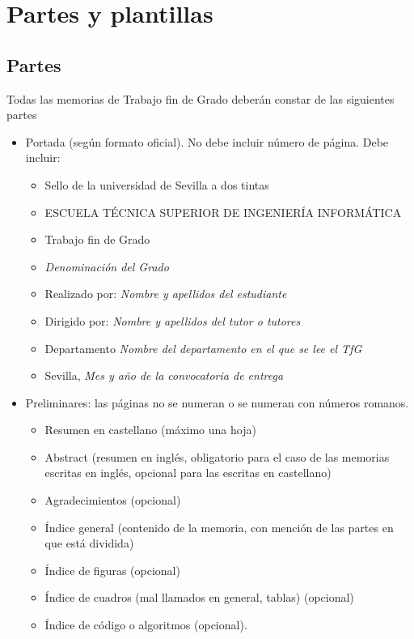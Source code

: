 
\chapter{Partes y plantillas}

\section{Partes}\label{sec:partes}

Todas las memorias de Trabajo fin de Grado deberán constar de las siguientes partes 
\begin{itemize}
 \item Portada (seg\'un formato oficial). No debe incluir n\'umero de p\'agina. Debe incluir:
 \begin{itemize}
 \item Sello de la universidad de Sevilla a dos tintas
 \item ESCUELA T\'ECNICA SUPERIOR DE INGENIER\'IA INFORM\'ATICA
 \item Trabajo fin de Grado
 \item \emph{Denominaci\'on del Grado}
 \item Realizado por: \emph{Nombre y apellidos del estudiante}
 \item Dirigido por: \emph{Nombre y apellidos del tutor o tutores}
 \item Departamento \emph{Nombre del departamento en el que se lee el TfG}
 \item Sevilla, \emph{Mes y año de la convocatoria de entrega}
 \end{itemize}
  \item Preliminares: las p\'aginas no se numeran o se numeran con n\'umeros romanos.
 \begin{itemize} 
\item Resumen en castellano (m\'aximo una hoja)
 \item Abstract (resumen en ingl\'es, obligatorio para el caso de las memorias escritas en ingl\'es, opcional
 para las escritas en castellano)
 \item Agradecimientos (opcional)
 \item \'Indice general (contenido de la memoria, con menci\'on de las partes en que está dividida)
 \item \'Indice de figuras (opcional)
 \item \'Indice de cuadros (mal llamados en general, tablas) (opcional)
 \item \'Indice de c\'odigo o algoritmos (opcional). 

\end{itemize}
\end{itemize}
